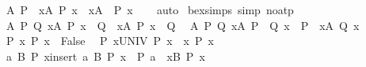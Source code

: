 \begin{isabellebody}
\ \ {\isachardoublequoteopen}{\isasymAnd}A\ P{\isachardot}{\kern0pt}\ {\isacharparenleft}{\kern0pt}{\isasymnot}\ {\isacharparenleft}{\kern0pt}{\isasymforall}x{\isasymin}A{\isachardot}{\kern0pt}\ P\ x{\isacharparenright}{\kern0pt}{\isacharparenright}{\kern0pt}\ {\isasymlongleftrightarrow}\ {\isacharparenleft}{\kern0pt}{\isasymexists}x{\isasymin}A{\isachardot}{\kern0pt}\ {\isasymnot}\ P\ x{\isacharparenright}{\kern0pt}{\isachardoublequoteclose}\isanewline
%
\isadelimproof
\ \ %
\endisadelimproof
%
\isatagproof
{}\isamarkupfalse%
\ auto%
\endisatagproof
{\isafoldproof}%
%
\isadelimproof
\isanewline
%
\endisadelimproof
\isanewline
{}\isamarkupfalse%
\ bex{\isacharunderscore}{\kern0pt}simps\ {\isacharbrackleft}{\kern0pt}simp{\isacharcomma}{\kern0pt}\ no{\isacharunderscore}{\kern0pt}atp{\isacharbrackright}{\kern0pt}{\isacharcolon}{\kern0pt}\isanewline
\ \ {\isachardoublequoteopen}{\isasymAnd}A\ P\ Q{\isachardot}{\kern0pt}\ {\isacharparenleft}{\kern0pt}{\isasymexists}x{\isasymin}A{\isachardot}{\kern0pt}\ P\ x\ {\isasymand}\ Q{\isacharparenright}{\kern0pt}\ {\isasymlongleftrightarrow}\ {\isacharparenleft}{\kern0pt}{\isacharparenleft}{\kern0pt}{\isasymexists}x{\isasymin}A{\isachardot}{\kern0pt}\ P\ x{\isacharparenright}{\kern0pt}\ {\isasymand}\ Q{\isacharparenright}{\kern0pt}{\isachardoublequoteclose}\isanewline
\ \ {\isachardoublequoteopen}{\isasymAnd}A\ P\ Q{\isachardot}{\kern0pt}\ {\isacharparenleft}{\kern0pt}{\isasymexists}x{\isasymin}A{\isachardot}{\kern0pt}\ P\ {\isasymand}\ Q\ x{\isacharparenright}{\kern0pt}\ {\isasymlongleftrightarrow}\ {\isacharparenleft}{\kern0pt}P\ {\isasymand}\ {\isacharparenleft}{\kern0pt}{\isasymexists}x{\isasymin}A{\isachardot}{\kern0pt}\ Q\ x{\isacharparenright}{\kern0pt}{\isacharparenright}{\kern0pt}{\isachardoublequoteclose}\isanewline
\ \ {\isachardoublequoteopen}{\isasymAnd}P{\isachardot}{\kern0pt}\ {\isacharparenleft}{\kern0pt}{\isasymexists}x{\isasymin}{\isacharbraceleft}{\kern0pt}{\isacharbraceright}{\kern0pt}{\isachardot}{\kern0pt}\ P\ x{\isacharparenright}{\kern0pt}\ {\isasymlongleftrightarrow}\ False{\isachardoublequoteclose}\isanewline
\ \ {\isachardoublequoteopen}{\isasymAnd}P{\isachardot}{\kern0pt}\ {\isacharparenleft}{\kern0pt}{\isasymexists}x{\isasymin}UNIV{\isachardot}{\kern0pt}\ P\ x{\isacharparenright}{\kern0pt}\ {\isasymlongleftrightarrow}\ {\isacharparenleft}{\kern0pt}{\isasymexists}x{\isachardot}{\kern0pt}\ P\ x{\isacharparenright}{\kern0pt}{\isachardoublequoteclose}\isanewline
\ \ {\isachardoublequoteopen}{\isasymAnd}a\ B\ P{\isachardot}{\kern0pt}\ {\isacharparenleft}{\kern0pt}{\isasymexists}x{\isasymin}insert\ a\ B{\isachardot}{\kern0pt}\ P\ x{\isacharparenright}{\kern0pt}\ {\isasymlongleftrightarrow}\ {\isacharparenleft}{\kern0pt}P\ a\ {\isasymor}\ {\isacharparenleft}{\kern0pt}{\isasymexists}x{\isasymin}B{\isachardot}{\kern0pt}\ P\ x{\isacharparenright}{\kern0pt}{\isacharparenright}{\kern0pt}{\isachardoublequoteclose}\isanewline

\end{isabellebody}
